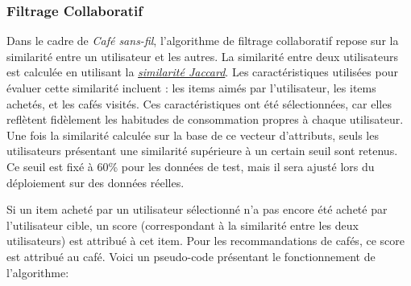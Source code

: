 \documentclass[11pt]{article}
\begin{document}
\subsubsection{Filtrage Collaboratif}
Dans le cadre de \textit{Café sans-fil}, l'algorithme de filtrage collaboratif repose sur la similarité entre un utilisateur et les autres. La similarité entre deux utilisateurs est calculée en utilisant la \hyperref[jaccard]{\textit{similarité Jaccard}}. Les caractéristiques utilisées pour évaluer cette similarité incluent : les items aimés par l'utilisateur, les items achetés, et les cafés visités. Ces caractéristiques ont été sélectionnées, car elles reflètent fidèlement les habitudes de consommation propres à chaque utilisateur. Une fois la similarité calculée sur la base de ce vecteur d'attributs, seuls les utilisateurs présentant une similarité supérieure à un certain seuil sont retenus. Ce seuil est fixé à 60\% pour les données de test, mais il sera ajusté lors du déploiement sur des données réelles.\

Si un item acheté par un utilisateur sélectionné n'a pas encore été acheté par l'utilisateur cible, un score (correspondant à la similarité entre les deux utilisateurs) est attribué à cet item. Pour les recommandations de cafés, ce score est attribué au café. Voici un pseudo-code présentant le fonctionnement de l'algorithme:
\end{document}

